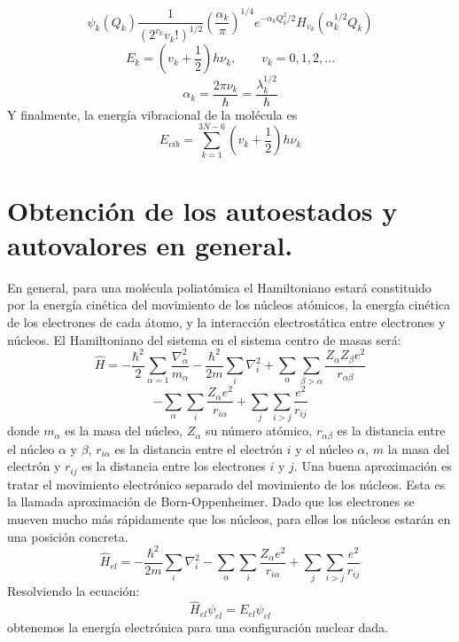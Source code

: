 \documentclass[a4paper]{article}
\begin{document}
\begin{equation}
\psi_k(Q_k)\frac{1}{\left(2^{v_k}v_k!\right)^{1/2}}\left(\frac{\alpha_k}{\pi}\right)^{1/4}e^{-\alpha_kQ^2_k/2}H_{v_k}(\alpha_k^{1/2}Q_k)
\end{equation}
\begin{equation}
E_k=\left(v_k+\frac{1}{2}\right)h\nu_k,	\qquad v_k=0,1,2,...
\end{equation}
\begin{equation}
\alpha_k=\frac{2\pi\nu_k}{\hbar}=\frac{\lambda_k^{1/2}}{\hbar}
\end{equation}
Y finalmente, la energía vibracional de la molécula es
\begin{equation}
E_{vib}=\sum_{k=1}^{3N-6}\left(v_k+\frac{1}{2}\right)h\nu_k
\end{equation}
\section{Obtención de los autoestados y autovalores en general.}
En general, para una molécula poliatómica el Hamiltoniano estará constituido por la energía cinética del movimiento de los núcleos atómicos, la energía cinética de los electrones de cada átomo, y la interacción electrostática entre electrones y núcleos. El Hamiltoniano del sistema en el sistema centro de masas será:
$$
\hat H = -\frac{\hbar^2}{2}\sum_{\alpha=1}\frac{\nabla_\alpha^2}{m_\alpha}-\frac{\hbar^2}{2m}\sum_{i}\nabla_i^2+\sum_\alpha\sum_{\beta >\alpha}\frac{Z_\alpha Z_\beta e^2}{r_{\alpha \beta}}
$$
\begin{equation}
-\sum_\alpha\sum_i\frac{Z_\alpha e^2}{r_{i\alpha}}+\sum_j\sum_{i>j}\frac{e^2}{r_{ij}}
\end{equation}
donde $m_\alpha$ es la masa del núcleo, $Z_\alpha$ su número atómico, $r_{\alpha\beta}$ es la distancia entre el núcleo $\alpha$ y $\beta$, $r_{i\alpha}$ es la distancia entre el electrón $i$ y el núcleo $\alpha$, $m$ la masa del electrón y $r_{ij}$ es la distancia entre los electrones $i$ y $j$. 
Una buena aproximación es tratar el movimiento electrónico separado del movimiento de los núcleos. Esta es la llamada aproximación de Born-Oppenheimer. Dado que los electrones se mueven mucho más rápidamente que los núcleos, para ellos los núcleos estarán en una posición concreta. 
\begin{equation}
\hat H_{el} = -\frac{\hbar^2}{2m}\sum_{i}\nabla_i^2-\sum_\alpha\sum_i\frac{Z_\alpha e^2}{r_{i\alpha}}+\sum_j\sum_{i>j}\frac{e^2}{r_{ij}}
\end{equation}
Resolviendo la ecuación:
\begin{equation}
\hat H_{el}\psi_{el}=E_{el}\psi_{el}
\end{equation}
obtenemos la energía electrónica para una configuración nuclear dada.
\end{document}
